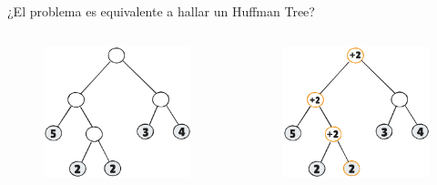 \documentclass[12pt]{beamer}
\begin{document}
\begin{frame}
\begin{bloque}
¿El problema es equivalente a hallar un Huffman Tree?

\begin{columns}
\begin{column}{0.4\textwidth}
\begin{figure}
    \centering
    \includegraphics[width=\linewidth]{img/ht1.png}
    \label{fig:enter-label}
\end{figure}
\end{column}
\begin{column}{0.4\textwidth}
\begin{figure}
    \centering
    \includegraphics[width=\linewidth]{img/ht2.png}
    \label{fig:enter-label}
\end{figure}
\end{column}
\end{columns}
\end{bloque}
\end{frame}
\end{document}
